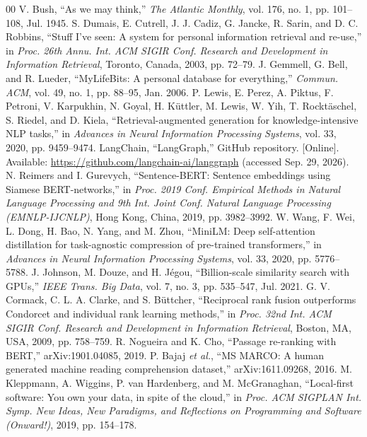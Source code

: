 \documentclass[conference]{IEEEtran}
\begin{document}
\begin{thebibliography}{00}
 V. Bush, ``As we may think,'' \textit{The Atlantic Monthly}, vol. 176, no. 1, pp. 101--108, Jul. 1945.
 S. Dumais, E. Cutrell, J. J. Cadiz, G. Jancke, R. Sarin, and D. C. Robbins, ``Stuff I've seen: A system for personal information retrieval and re-use,'' in \textit{Proc. 26th Annu. Int. ACM SIGIR Conf. Research and Development in Information Retrieval}, Toronto, Canada, 2003, pp. 72--79.
 J. Gemmell, G. Bell, and R. Lueder, ``MyLifeBits: A personal database for everything,'' \textit{Commun. ACM}, vol. 49, no. 1, pp. 88--95, Jan. 2006.
 P. Lewis, E. Perez, A. Piktus, F. Petroni, V. Karpukhin, N. Goyal, H. K\"{u}ttler, M. Lewis, W. Yih, T. Rockt\"{a}schel, S. Riedel, and D. Kiela, ``Retrieval-augmented generation for knowledge-intensive NLP tasks,'' in \textit{Advances in Neural Information Processing Systems}, vol. 33, 2020, pp. 9459--9474.
 LangChain, ``LangGraph,'' GitHub repository. [Online]. Available: \url{https://github.com/langchain-ai/langgraph} (accessed Sep. 29, 2026).
 N. Reimers and I. Gurevych, ``Sentence-BERT: Sentence embeddings using Siamese BERT-networks,'' in \textit{Proc. 2019 Conf. Empirical Methods in Natural Language Processing and 9th Int. Joint Conf. Natural Language Processing (EMNLP-IJCNLP)}, Hong Kong, China, 2019, pp. 3982--3992.
 W. Wang, F. Wei, L. Dong, H. Bao, N. Yang, and M. Zhou, ``MiniLM: Deep self-attention distillation for task-agnostic compression of pre-trained transformers,'' in \textit{Advances in Neural Information Processing Systems}, vol. 33, 2020, pp. 5776--5788.
 J. Johnson, M. Douze, and H. J\'{e}gou, ``Billion-scale similarity search with GPUs,'' \textit{IEEE Trans. Big Data}, vol. 7, no. 3, pp. 535--547, Jul. 2021.
 G. V. Cormack, C. L. A. Clarke, and S. B\"{u}ttcher, ``Reciprocal rank fusion outperforms Condorcet and individual rank learning methods,'' in \textit{Proc. 32nd Int. ACM SIGIR Conf. Research and Development in Information Retrieval}, Boston, MA, USA, 2009, pp. 758--759.
 R. Nogueira and K. Cho, ``Passage re-ranking with BERT,'' arXiv:1901.04085, 2019.
 P. Bajaj \textit{et al.}, ``MS MARCO: A human generated machine reading comprehension dataset,'' arXiv:1611.09268, 2016.
 M. Kleppmann, A. Wiggins, P. van Hardenberg, and M. McGranaghan, ``Local-first software: You own your data, in spite of the cloud,'' in \textit{Proc. ACM SIGPLAN Int. Symp. New Ideas, New Paradigms, and Reflections on Programming and Software (Onward!)}, 2019, pp. 154--178.
\end{thebibliography}
\end{document}
